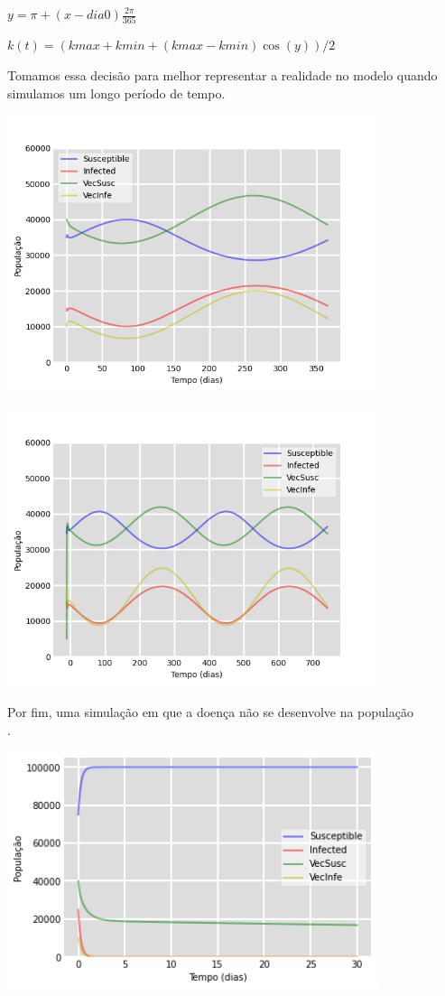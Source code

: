 \documentclass[
	12pt,				%
	openright,			%
	twoside,			%
	a4paper,			%
	english,			%
	french,				%
	spanish,			%
	brazil				%
	]{abntex2}
\begin{document}
    $y = \pi + (x-dia0)\frac{2\pi}{365}$
    
    $k(t) = (kmax + kmin + (kmax-kmin)\cos(y))/2$

Tomamos essa decisão para melhor representar a realidade no modelo quando simulamos um longo período de tempo. 


\includegraphics[width=410px]{Figure_10.png}

\includegraphics[width=410px]{Figure_4.png}

Por fim, uma simulação em que a doença não se desenvolve na população\\.

\includegraphics[width=410px]{output.png}
\end{document}
